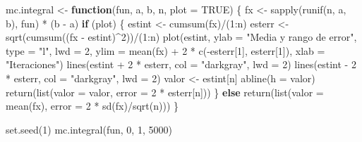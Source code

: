 \documentclass[
]{book}
\newenvironment{Shaded}{\begin{snugshade}}{\end{snugshade}}
\newcommand{\AttributeTok}[1]{\textcolor[rgb]{0.77,0.63,0.00}{#1}}
\newcommand{\ConstantTok}[1]{\textcolor[rgb]{0.00,0.00,0.00}{#1}}
\newcommand{\ControlFlowTok}[1]{\textcolor[rgb]{0.13,0.29,0.53}{\textbf{#1}}}
\newcommand{\DecValTok}[1]{\textcolor[rgb]{0.00,0.00,0.81}{#1}}
\newcommand{\FunctionTok}[1]{\textcolor[rgb]{0.00,0.00,0.00}{#1}}
\newcommand{\NormalTok}[1]{#1}
\newcommand{\OtherTok}[1]{\textcolor[rgb]{0.56,0.35,0.01}{#1}}
\newcommand{\SpecialCharTok}[1]{\textcolor[rgb]{0.00,0.00,0.00}{#1}}
\newcommand{\StringTok}[1]{\textcolor[rgb]{0.31,0.60,0.02}{#1}}
\theoremstyle{break}
\theoremstyle{definition}
\theoremstyle{definition}
\theoremstyle{definition}
\theoremstyle{definition}
\theoremstyle{remark}
\begin{document}
\begin{Shaded}
\begin{Highlighting}[]
\NormalTok{  mc.integral }\OtherTok{\textless{}{-}} \ControlFlowTok{function}\NormalTok{(fun, a, b, n, }\AttributeTok{plot =} \ConstantTok{TRUE}\NormalTok{) \{}
\NormalTok{    fx }\OtherTok{\textless{}{-}} \FunctionTok{sapply}\NormalTok{(}\FunctionTok{runif}\NormalTok{(n, a, b), fun) }\SpecialCharTok{*}\NormalTok{ (b }\SpecialCharTok{{-}}\NormalTok{ a)}
    \ControlFlowTok{if}\NormalTok{ (plot) \{}
\NormalTok{      estint }\OtherTok{\textless{}{-}} \FunctionTok{cumsum}\NormalTok{(fx)}\SpecialCharTok{/}\NormalTok{(}\DecValTok{1}\SpecialCharTok{:}\NormalTok{n)}
\NormalTok{      esterr }\OtherTok{\textless{}{-}} \FunctionTok{sqrt}\NormalTok{(}\FunctionTok{cumsum}\NormalTok{((fx }\SpecialCharTok{{-}}\NormalTok{ estint)}\SpecialCharTok{\^{}}\DecValTok{2}\NormalTok{))}\SpecialCharTok{/}\NormalTok{(}\DecValTok{1}\SpecialCharTok{:}\NormalTok{n)}
      \FunctionTok{plot}\NormalTok{(estint, }\AttributeTok{ylab =} \StringTok{"Media y rango de error"}\NormalTok{, }\AttributeTok{type =} \StringTok{"l"}\NormalTok{, }\AttributeTok{lwd =} \DecValTok{2}\NormalTok{, }\AttributeTok{ylim =} \FunctionTok{mean}\NormalTok{(fx) }\SpecialCharTok{+} 
             \DecValTok{2} \SpecialCharTok{*} \FunctionTok{c}\NormalTok{(}\SpecialCharTok{{-}}\NormalTok{esterr[}\DecValTok{1}\NormalTok{], esterr[}\DecValTok{1}\NormalTok{]), }\AttributeTok{xlab =} \StringTok{"Iteraciones"}\NormalTok{)}
      \FunctionTok{lines}\NormalTok{(estint }\SpecialCharTok{+} \DecValTok{2} \SpecialCharTok{*}\NormalTok{ esterr, }\AttributeTok{col =} \StringTok{"darkgray"}\NormalTok{, }\AttributeTok{lwd =} \DecValTok{2}\NormalTok{)}
      \FunctionTok{lines}\NormalTok{(estint }\SpecialCharTok{{-}} \DecValTok{2} \SpecialCharTok{*}\NormalTok{ esterr, }\AttributeTok{col =} \StringTok{"darkgray"}\NormalTok{, }\AttributeTok{lwd =} \DecValTok{2}\NormalTok{)}
\NormalTok{      valor }\OtherTok{\textless{}{-}}\NormalTok{ estint[n]}
      \FunctionTok{abline}\NormalTok{(}\AttributeTok{h =}\NormalTok{ valor)}
      \FunctionTok{return}\NormalTok{(}\FunctionTok{list}\NormalTok{(}\AttributeTok{valor =}\NormalTok{ valor, }\AttributeTok{error =} \DecValTok{2} \SpecialCharTok{*}\NormalTok{ esterr[n]))}
\NormalTok{    \} }\ControlFlowTok{else} \FunctionTok{return}\NormalTok{(}\FunctionTok{list}\NormalTok{(}\AttributeTok{valor =} \FunctionTok{mean}\NormalTok{(fx), }\AttributeTok{error =} \DecValTok{2} \SpecialCharTok{*} \FunctionTok{sd}\NormalTok{(fx)}\SpecialCharTok{/}\FunctionTok{sqrt}\NormalTok{(n)))}
\NormalTok{  \}}

\FunctionTok{set.seed}\NormalTok{(}\DecValTok{1}\NormalTok{)}
\FunctionTok{mc.integral}\NormalTok{(fun, }\DecValTok{0}\NormalTok{, }\DecValTok{1}\NormalTok{, }\DecValTok{5000}\NormalTok{)}
\end{Highlighting}
\end{Shaded}
\end{document}

